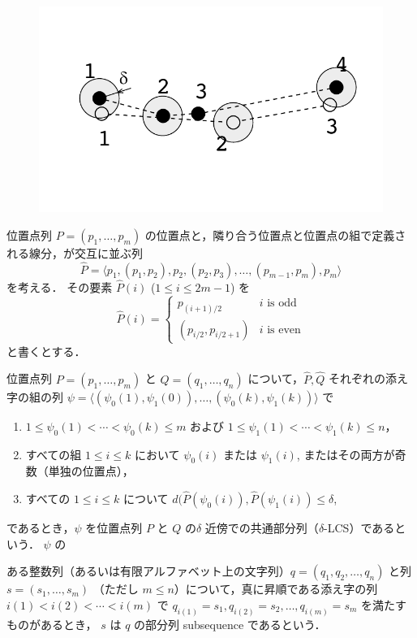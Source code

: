\documentclass[11pt]{jarticle}
\begin{document}
\begin{figure}[h]
\centering
\includegraphics[scale=0.5]{matching.pdf}
\end{figure}

位置点列 $P=(p_1, \ldots, p_m)$ の位置点と，隣り合う位置点と位置点の組で定義される線分，が交互に並ぶ列
\[
\hat{P} = \langle p_1, (p_1, p_2), p_2, (p_2, p_3), \ldots, (p_{m-1}, p_m), p_m \rangle
\]
を考える．
その要素 $\hat{P}(i)$ ($1 \leq i \leq 2m-1$) を
\[
\hat{P}(i) = \left\{
\begin{array}{ll}
p_{(i+1)/2} & \mbox{$i$ is odd}\\
(p_{i/2}, p_{i/2 + 1}) & \mbox{$i$ is even}
\end{array}
\right.
\]
と書くとする． 

位置点列 $P = (p_1, \ldots, p_m)$ と $Q = (q_1, \ldots, q_n)$ について，$\hat{P}, \hat{Q}$ それぞれの添え字の組の列
$\psi = \langle (\psi_0(1), \psi_1(0)), \ldots, (\psi_0(k), \psi_1(k)) \rangle$ で
\begin{enumerate}
\item $1 \leq \psi_0(1) < \cdots < \psi_0(k) \leq m$ および $1 \leq \psi_1(1) < \cdots < \psi_1(k) \leq n$，
\item すべての組 $1 \leq i \leq k$ において $\psi_0(i)$ または $\psi_1(i)$, またはその両方が奇数（単独の位置点），
\item すべての $1 \leq i \leq k$ について $d(\hat{P}(\psi_0(i)), \hat{P}(\psi_1(i)) \leq \delta$,  
\end{enumerate}
であるとき，$\psi$ を位置点列 $P$ と $Q$ の$\delta$ 近傍での共通部分列（$\delta$-LCS）であるという．
$\psi$ の

\newpage

ある整数列（あるいは有限アルファベット上の文字列）$q = (q_1, q_2, \ldots, q_n)$ と列 $s = (s_1, \ldots, s_m)$ （ただし $m \leq n$）について，真に昇順である添え字の列 $i(1) < i(2) < \cdots < i(m)$ で $q_{i(1)} = s_1, q_{i(2)} = s_2, \ldots, q_{i(m)} = s_m$ を満たすものがあるとき，
$s$ は $q$ の部分列 subsequence であるという．
\end{document}
